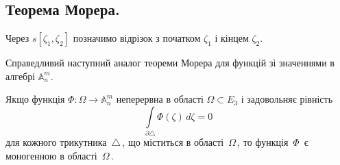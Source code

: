 \documentclass[11pt, reqno]{amsart}
\begin{document}
\subsection{Теорема Морера.}

Через $s[\zeta_1,\zeta_2]$ позначимо відрізок з початком $\zeta_1$ і кінцем $\zeta_2$.

Справедливий наступний аналог теореми Морера для функцій зі значеннями в алгебрі $\mathbb{A}_n^m$.

\begin{theorem}\label{3-2:teo_Morera}
Якщо функція $\Phi:\Omega\rightarrow\mathbb{A}_n^m$ неперервна в області $\Omega\subset E_3$ і задовольняє рівність
\begin{equation} \label{3-2:Morera}
\int\limits_{\partial\triangle}\Phi(\zeta)\,d\zeta=0
\end{equation}
 для кожного трикутника\, $\triangle$\,, що міститься в області\, $\Omega$\,,
 то функція\, $\Phi$\, є моногенною в області\, $\Omega$\,.
\end{theorem}
\end{document}
